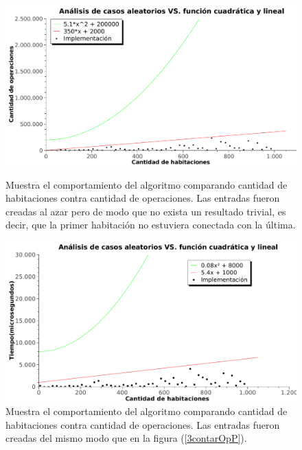 
\begin{figure}[htb]
    \begin{minipage}{\textwidth}
	\begin{center}
		\includegraphics[width=\textwidth]{../ej3/graficos/3_ej_contarOperacionesP.pdf}
		\caption{Muestra el comportamiento del algoritmo comparando cantidad de habitaciones contra cantidad de operaciones. Las entradas fueron creadas al azar pero de modo que no exista un resultado trivial, es decir, que la primer habitación no estuviera conectada con la última.}
		\label{3contarOpP}
	\end{center}
    \end{minipage}

    \begin{minipage}{\textwidth}
	\begin{center}
		\includegraphics[width=\textwidth]{../ej3/graficos/3_ej_contarTiempoP.pdf}
		\caption{Muestra el comportamiento del algoritmo comparando cantidad de habitaciones contra cantidad de operaciones. Las entradas fueron creadas del mismo modo que en la figura (\ref{3contarOpP}).}
		\label{3contarTiempoP}
	\end{center}
    \end{minipage}

\end{figure}


